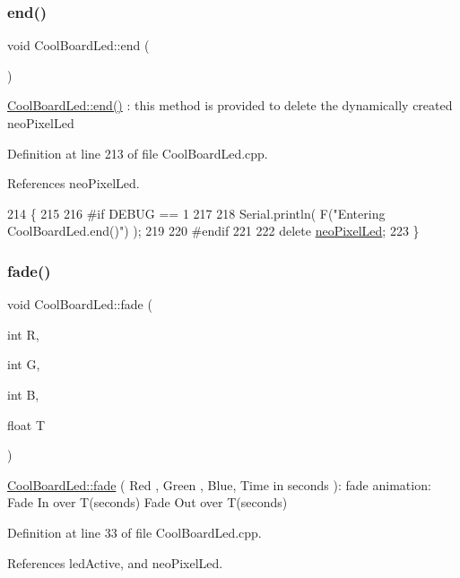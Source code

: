 \subsubsection{\texorpdfstring{end()}{end()}}
{\footnotesize\ttfamily void Cool\+Board\+Led\+::end (\begin{DoxyParamCaption}{ }\end{DoxyParamCaption})}

\hyperlink{classCoolBoardLed_a69f323359e0c9f797422f2152b5d41ef}{Cool\+Board\+Led\+::end()} \+: this method is provided to delete the dynamically created neo\+Pixel\+Led 

Definition at line 213 of file Cool\+Board\+Led.\+cpp.



References neo\+Pixel\+Led.


\begin{DoxyCode}
214 \{
215 
216 \textcolor{preprocessor}{#if DEBUG == 1 }
217     
218     Serial.println( F(\textcolor{stringliteral}{"Entering CoolBoardLed.end()"}) );
219 
220 \textcolor{preprocessor}{#endif}
221 
222     \textcolor{keyword}{delete} \hyperlink{classCoolBoardLed_ac2c13fa462a010cd9242bf297c013923}{neoPixelLed};
223 \}
\end{DoxyCode}
\mbox{\label{classCoolBoardLed_af1cacbaa88db8bcf6042c1083ba41155}} 
\subsubsection{\texorpdfstring{fade()}{fade()}}
{\footnotesize\ttfamily void Cool\+Board\+Led\+::fade (\begin{DoxyParamCaption}\item[{int}]{R,  }\item[{int}]{G,  }\item[{int}]{B,  }\item[{float}]{T }\end{DoxyParamCaption})}

\hyperlink{classCoolBoardLed_af1cacbaa88db8bcf6042c1083ba41155}{Cool\+Board\+Led\+::fade} ( Red , Green , Blue, Time in seconds )\+: fade animation\+: Fade In over T(seconds) Fade Out over T(seconds) 

Definition at line 33 of file Cool\+Board\+Led.\+cpp.



References led\+Active, and neo\+Pixel\+Led.



